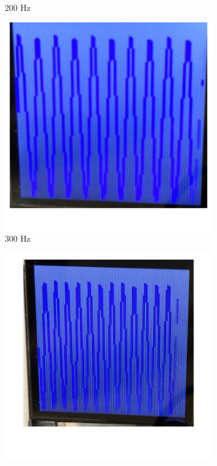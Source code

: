 \documentclass[12pt]{article}
\begin{document}
\begin{figure}[H]
\begin{subfigure}[b]{0.3\textwidth}
    \caption{200 Hz}
    \label{fig:raw_200}
  \end{subfigure}
  \begin{subfigure}[b]{0.3\textwidth}
    \includegraphics[width=\textwidth]{./img/raw_300Hz}
    \caption{300 Hz}
    \label{fig:raw_300}
  \end{subfigure}
  \begin{subfigure}[b]{0.3\textwidth}
    \includegraphics[width=\textwidth]{./img/raw_400Hz}

\end{subfigure}
\end{figure}
\end{document}
